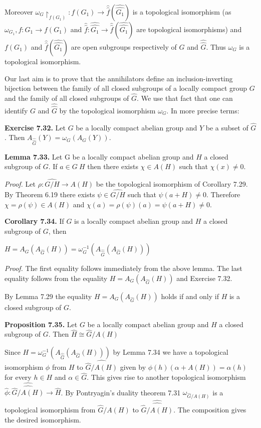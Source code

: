 \documentclass[12pt]{article}
\begin{document}
\begin{itemize}
\begin{itemize}
    Moreover $\omega_G \upharpoonright_{f(G_1)}: f(G_1) \to \hat{\hat{f}}(\hat{\hat{G_1}})$ is a topological isomorphism (as $\omega_{G_1}, f : G_1 \to f(G_1)$
and $\hat{\hat{f}} : \hat{\hat{G_1}} \to \hat{\hat{f}}(\hat{\hat{G_1}})$ are topological isomorphisms) and $f(G_1)$ and $\hat{\hat{f}}(\hat{\hat{G_1}})$ are open subgroups respectively of $G$ and $\hat{\hat{G}}$. Thus
$\omega_G$ is a topological isomorphism.


    Our last aim is to prove that the annihilators define an inclusion-inverting bijection between the family of
all closed subgroups of a locally compact group $G$ and the family of all closed subgroups of $\hat{G}$. We use that fact
that one can identify $G$ and $\hat{\hat{G}}$ by the topological isomorphism $\omega_G$. In more precise terms:


\textbf{Exercise 7.32.} Let $G$ be a locally compact abelian group and $Y$ be a subset of $\hat{G}$. Then $A_{\hat{\hat{G}}}(Y ) = \omega_G(A_G(Y ))$.


\textbf{Lemma 7.33.} Let G be a locally compact abelian group and $H$ a closed subgroup of $G$. If $a \in G \ H$ then there
exists $\chi \in A(H)$ such that $\chi(x) \neq 0$.


\emph{Proof.} Let $\rho : \hat{G/H} \to A(H)$ be the topological isomorphism of Corollary 7.29. By Theorem 6.19 there exists
$\psi \in \hat{G/H}$ such that $\psi(a + H) \neq 0$. Therefore $\chi = \rho(\psi) \in A(H)$ and $\chi(a) = \rho(\psi)(a) = \psi(a + H) \neq 0$.


\textbf{Corollary 7.34.} If $G$ is a locally compact abelian group and $H$ a closed subgroup of $G$, then


    $H = A_G (A_{\hat{G}}(H)) = \omega_G^{-1}(A_{\hat{\hat{G}}}(A_{\hat{G}}(H)))$


\emph{Proof.} The first equality follows immediately from the above lemma.
The last equality follows from the equality $H = A_G (A_{\hat{G}}(H))$ and Exercise 7.32.


    By Lemma 7.29 the equality $H = A_G (A_{\hat{G}}(H))$ holds if and only if $H$ is a closed subgroup of $G$.


\textbf{Proposition 7.35.} Let $G$ be a locally compact abelian group and $H$ a closed subgroup of $G$. Then $\hat{H} \cong \hat{G} / A(H)$


 Since $H = \omega_G^{-1}(A_{\hat{\hat{G}}}(A_{\hat{G}}(H)))$  by Lemma 7.34 we have a topological isomorphism $\phi$ from $H$ to $\hat{\hat{G} / A(H)}$
given by $\phi(h)(\alpha + A(H))=\alpha(h)$ for every $h \in H$ and $\alpha \in \hat{G}$. This gives rise to another topological isomorphism
$\hat{\phi} : \hat{\hat{\hat{G} / A(H)}} \to \hat{H}$.  By Pontryagin's duality theorem 7.31 $\omega_{\hat{G}/A(H)}$ is a topological isomorphism from $\hat{G}/A(H)$
to $\hat{\hat{\hat{G} / A(H)}}$. The composition gives the desired isomorphism.



\end{itemize}
\end{itemize}
\end{document}
